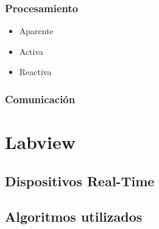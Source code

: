     \subsubsection{Procesamiento}

      \begin{itemize}
        \item Aparente
        \item Activa
        \item Reactiva
      \end{itemize}



    \subsubsection{Comunicación}

\section{Labview}
  \subsection{Dispositivos Real-Time}
  \subsection{Algoritmos utilizados}
